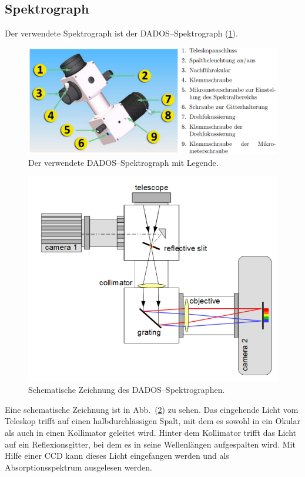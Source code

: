 \subsection{Spektrograph}
Der verwendete Spektrograph ist der \textsc{DADOS}--Spektrograph (\ref{fig:dados}).
\begin{figure}[t]
  \centering
  \includegraphics[width=.5\textwidth]{464_dados_spektrograph.png}
  \caption{Der verwendete DADOS--Spektrograph mit Legende.\cite{anleitung464}} \label{fig:dados}
\end{figure}
\begin{figure}[t]
  \centering
  \includegraphics[width=.5\textwidth]{464_dados_schema.png}
  \caption{Schematische Zeichnung des DADOS--Spektrographen.\cite{anleitung464}} \label{fig:dados_schema}
\end{figure}
Eine schematische Zeichnung ist in Abb.\ (\ref{fig:dados_schema}) zu sehen.
Das eingehende Licht vom Teleskop trifft auf einen halbdurchlässigen Spalt, mit dem es sowohl in ein Okular als auch in einen Kollimator geleitet wird.
Hinter dem Kollimator trifft das Licht auf ein Reflexionsgitter, bei dem es in seine Wellenlängen aufgespalten wird.
Mit Hilfe einer CCD kann dieses Licht eingefangen werden und als Absorptionsspektrum ausgelesen werden.
